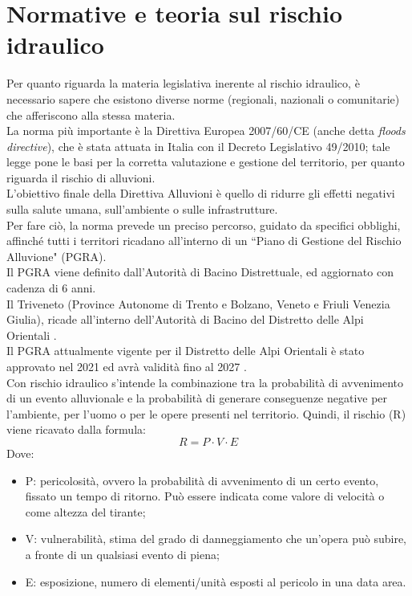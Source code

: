 \section{Normative e teoria sul rischio idraulico}
\label{section:normative}
Per quanto riguarda la materia legislativa inerente al rischio idraulico, è necessario sapere che esistono diverse norme (regionali, nazionali o comunitarie) che afferiscono alla stessa materia.\\
La norma più importante è la Direttiva Europea 2007/60/CE (anche detta \textit{floods directive}), che è stata attuata in Italia con il Decreto Legislativo 49/2010; tale legge pone le basi per la corretta valutazione e gestione del territorio, per quanto riguarda il rischio di alluvioni.\\
L'obiettivo finale della Direttiva Alluvioni è quello di ridurre gli effetti negativi sulla salute umana, sull'ambiente o sulle infrastrutture.\\
Per fare ciò, la norma prevede un preciso percorso, guidato da specifici obblighi, affinché tutti i territori ricadano all'interno di un ``Piano di Gestione del Rischio Alluvione" (PGRA).\\
Il PGRA viene definito dall'Autorità di Bacino Distrettuale, ed aggiornato con cadenza di 6 anni.\\
Il Triveneto (Province Autonome di Trento e Bolzano, Veneto e Friuli Venezia Giulia), ricade all'interno dell'Autorità di Bacino del Distretto delle Alpi Orientali \cite{distrettoalpiorientali}.\\
Il PGRA attualmente vigente per il Distretto delle Alpi Orientali è stato approvato nel 2021 ed avrà validità fino al 2027 \cite{pgra}.\\
Con rischio idraulico s'intende la combinazione tra la probabilità di avvenimento di un evento alluvionale e la probabilità di generare conseguenze negative per l'ambiente, per l'uomo o per le opere presenti nel territorio. Quindi, il rischio (R) viene ricavato dalla formula:
\begin{equation}
    R = P \cdot V \cdot E
\end{equation}
Dove: 
\begin{itemize}
    \item P: pericolosità, ovvero la probabilità di avvenimento di un certo evento, fissato un tempo di ritorno. Può essere indicata come valore di velocità o come altezza del tirante;
    \item V: vulnerabilità, stima del grado di danneggiamento che un'opera può subire, a fronte di un qualsiasi evento di piena;
    \item E: esposizione, numero di elementi/unità esposti al pericolo in una data area.
\end{itemize}

